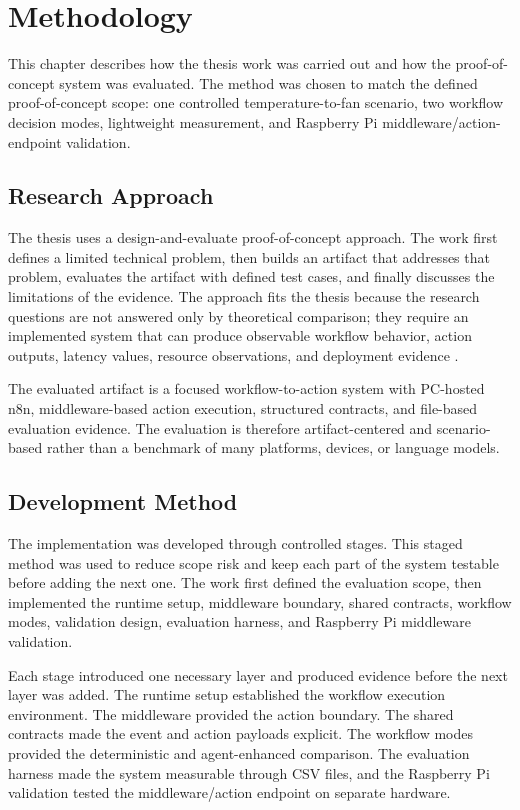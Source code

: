 \section{Methodology}\label{sec:methodology}

This chapter describes how the thesis work was carried out and how the proof-of-concept system was evaluated. The method was chosen to match the defined proof-of-concept scope: one controlled temperature-to-fan scenario, two workflow decision modes, lightweight measurement, and Raspberry Pi middleware/action-endpoint validation.

\subsection{Research Approach}\label{subsec:research-approach}

The thesis uses a design-and-evaluate proof-of-concept approach. The work first defines a limited technical problem, then builds an artifact that addresses that problem, evaluates the artifact with defined test cases, and finally discusses the limitations of the evidence. The approach fits the thesis because the research questions are not answered only by theoretical comparison; they require an implemented system that can produce observable workflow behavior, action outputs, latency values, resource observations, and deployment evidence \cite{designScienceHevner,designSciencePeffers}.

The evaluated artifact is a focused workflow-to-action system with PC-hosted n8n, middleware-based action execution, structured contracts, and file-based evaluation evidence. The evaluation is therefore artifact-centered and scenario-based rather than a benchmark of many platforms, devices, or language models.

\subsection{Development Method}\label{subsec:development-method}

The implementation was developed through controlled stages. This staged method was used to reduce scope risk and keep each part of the system testable before adding the next one. The work first defined the evaluation scope, then implemented the runtime setup, middleware boundary, shared contracts, workflow modes, validation design, evaluation harness, and Raspberry Pi middleware validation.

Each stage introduced one necessary layer and produced evidence before the next layer was added. The runtime setup established the workflow execution environment. The middleware provided the action boundary. The shared contracts made the event and action payloads explicit. The workflow modes provided the deterministic and agent-enhanced comparison. The evaluation harness made the system measurable through CSV files, and the Raspberry Pi validation tested the middleware/action endpoint on separate hardware.


